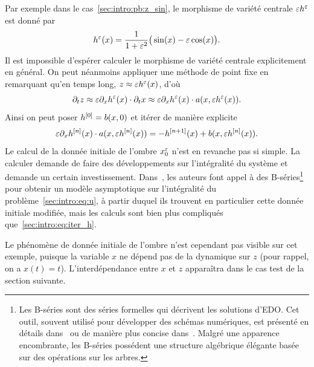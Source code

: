 Par exemple dans le cas~\eqref{sec:intro:pb:z_sin}, le morphisme de variété centrale $\varepsilon h^{\varepsilon}$ est donné par 
\begin{equation} \label{sec:intro:eq:h_sin}
    h^{\varepsilon}(x) 
    = \frac{1}{1 + \varepsilon^2} \big( \sin(x) - \varepsilon \cos(x) \big) .
\end{equation}
Il est impossible d'espérer calculer le morphisme de variété centrale explicitement en général. On peut néanmoins appliquer une méthode de point fixe en remarquant qu'en temps long, $z \approx \varepsilon h^{\varepsilon}(x)$, d'où 
\begin{equation*}
    \partial_t z \approx \varepsilon \partial_x h^{\varepsilon}(x) \cdot \partial_t x
    \approx \varepsilon \partial_x h^{\varepsilon}(x) \cdot a(x, \varepsilon h^{\varepsilon}(x)) . 
\end{equation*} Ainsi on peut poser $h^{[0]} = b(x,0)$ et itérer de manière explicite
\begin{equation} \label{sec:intro:eq:iter_h}
    \varepsilon \partial_x h^{[n]}(x) \cdot a(x, \varepsilon h^{[n]} (x)) 
    = - h^{[n+1]}(x) + b(x, \varepsilon h^{[n]} (x)) .
\end{equation}
Le calcul de la donnée initiale de l'ombre $x^{\varepsilon}_0$ n'est en revanche pas si simple. La calculer demande de faire des développements sur l'intégralité du système et demande un certain investissement. Dans~\cite{castella.2016.formal}, les auteurs font appel à des B-séries\footnote{
    Les B-séries sont des séries formelles qui décrivent les solutions d'EDO. Cet outil, souvent utilisé pour développer des schémas numériques, est présenté en détails dans~\cite[Chap.~III]{hairer.2006.geometric} ou de manière plus concise dans~\cite{chartier.2010.algebraic}. Malgré une apparence encombrante, les B-séries possédent une structure algébrique élégante basée sur des opérations sur les arbres.
} pour obtenir un modèle asymptotique sur l'intégralité du problème~\eqref{sec:intro:eq:u}, à partir duquel ils trouvent en particulier cette donnée initiale modifiée, mais les calculs sont bien plus compliqués que~\eqref{sec:intro:eq:iter_h}.

\begin{FRremark*}
    Le phénomène de donnée initiale de l'ombre n'est cependant pas visible sur cet exemple, puisque la variable $x$ ne dépend pas de la dynamique sur $z$ (pour rappel, on a $x(t) = t$). L'interdépendance entre $x$ et $z$ apparaîtra dans le cas test de la section suivante.
\end{FRremark*}

